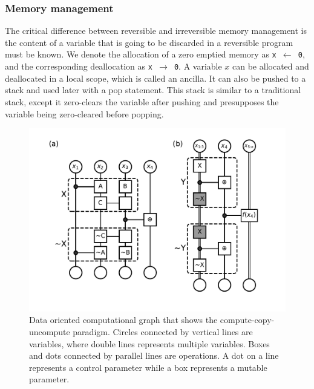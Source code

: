 \documentclass[aps,twocolumn,longbibliography,english,superscriptaddress]{revtex4-1}
\newcommand{\<}{\langle}
\renewcommand{\>}{\rangle}
\theoremstyle{definition}\newtheorem{definition}{\textit{Definition}}
\begin{document}
\subsubsection{Memory management}
    The critical difference between reversible and irreversible memory management is the content of a variable that is going to be discarded in a reversible program must be known.
    We denote the allocation of a zero emptied memory as \texttt{x $\leftarrow$ 0}, and the corresponding deallocation as \texttt{x $\rightarrow$ 0}.
    A variable $x$ can be allocated and deallocated in a local scope, which is called an ancilla.
    It can also be pushed to a stack and used later with a pop statement.
    This stack is similar to a traditional stack, except it zero-clears the variable after pushing and presupposes the variable being zero-cleared before popping.
\begin{figure}
    \centerline{\includegraphics[width=\columnwidth,trim={0 1cm 0 0cm},clip]{images/fig6.pdf}}
    \caption{Data oriented computational graph that shows the compute-copy-uncompute paradigm. Circles connected by vertical lines are variables, where double lines represents multiple variables. Boxes and dots connected by parallel lines are operations. A dot on a line represents a control parameter while a box represents a mutable parameter.
    }\label{fig:ccu}
\end{figure}
\end{document}

